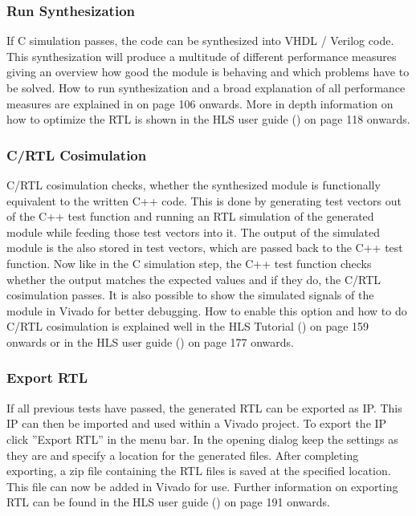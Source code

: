 \subsubsection{Run Synthesization}
If C simulation passes, the code can be synthesized into VHDL / Verilog code. This synthesization will produce a multitude of different performance measures giving an overview how good the module is behaving and which problems have to be solved. How to run synthesization and a broad explanation of all performance measures are explained in \cite{xilinx:hls_tutorial} on page 106 onwards. More in depth information on how to optimize the RTL is shown in the HLS user guide (\cite{xilinx:hls_bible}) on page 118 onwards.

\subsubsection{C/RTL Cosimulation}
C/RTL cosimulation checks, whether the synthesized module is functionally equivalent to the written C++ code. This is done by generating test vectors out of the C++ test function and running an RTL simulation of the generated module while feeding those test vectors into it. The output of the simulated module is the also stored in test vectors, which are passed back to the C++ test function. Now like in the C simulation step, the C++ test function checks whether the output matches the expected values and if they do, the C/RTL cosimulation passes.
It is also possible to show the simulated signals of the module in Vivado for better debugging. How to enable this option and how to do C/RTL cosimulation is explained well in the HLS Tutorial (\cite{xilinx:hls_tutorial}) on page 159 onwards or in the HLS user guide (\cite{xilinx:hls_bible}) on page 177 onwards.

\subsubsection{Export RTL}
If all previous tests have passed, the generated RTL can be exported as IP. This IP can then be imported and used within a Vivado project. To export the IP click ''Export RTL'' in the menu bar. In the opening dialog keep the settings as they are and specify a location for the generated files. After completing exporting, a zip file containing the RTL files is saved at the specified location. This file can now be added in Vivado for use. Further information on exporting RTL can be found in the HLS user guide (\cite{xilinx:hls_bible}) on page 191 onwards.

